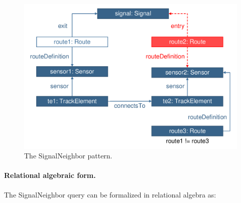 % 
%   
%   
%   

\begin{figure}[Htb]
		\centering
		\includegraphics[scale=0.4]{figures/trainbenchmark-signalneighbor}
		\caption{The \textsf{SignalNeighbor} pattern.}
		\label{fig:trainbenchmark-signalneighbor}
\end{figure}

\paragraph{Relational algebraic form.} The \textsf{SignalNeighbor} query can be formalized in relational algebra as:

